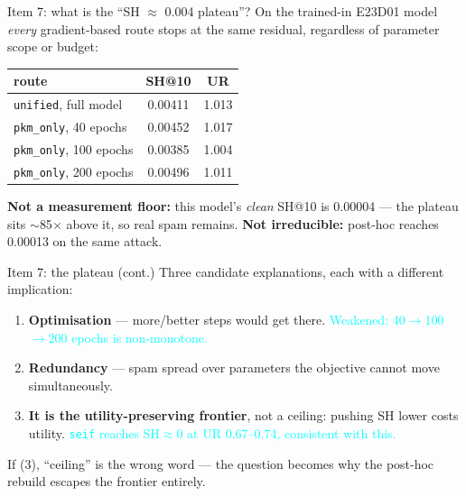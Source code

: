\documentclass{beamer}
\newcommand{\pierre}[1]{\textcolor{cyan}{#1}}
\begin{document}
\begin{frame}{Item 7: what is the ``SH $\approx$ 0.004 plateau''?}
On the trained-in E23D01 model \emph{every} gradient-based route stops at the
same residual, regardless of parameter scope or budget:
\begin{center}
\begin{tabular}{|l|c|c|}
\hline
route & SH@10 & UR \\
\hline
\texttt{unified}, full model   & 0.00411 & 1.013 \\
\texttt{pkm\_only}, 40 epochs  & 0.00452 & 1.017 \\
\texttt{pkm\_only}, 100 epochs & 0.00385 & 1.004 \\
\texttt{pkm\_only}, 200 epochs & 0.00496 & 1.011 \\
\hline
\end{tabular}
\end{center}

\textbf{Not a measurement floor:} this model's \emph{clean} SH@10 is 0.00004 ---
the plateau sits $\sim$85$\times$ above it, so real spam remains.
\textbf{Not irreducible:} post-hoc reaches 0.00013 on the same attack.

\end{frame}

\begin{frame}{Item 7: the plateau (cont.)}
Three candidate explanations, each with a different implication:
\begin{enumerate}
  \item \textbf{Optimisation} --- more/better steps would get there.
        \pierre{Weakened: 40$\to$100$\to$200 epochs is non-monotone.}
  \item \textbf{Redundancy} --- spam spread over parameters the objective cannot
        move simultaneously.
  \item \textbf{It is the utility-preserving frontier}, not a ceiling: pushing SH
        lower costs utility. \pierre{\texttt{seif} reaches SH$\approx$0 at
        UR 0.67--0.74, consistent with this.}
\end{enumerate}

\medskip
\alert{If (3), ``ceiling'' is the wrong word} --- the question becomes why the
post-hoc rebuild escapes the frontier entirely.
\end{frame}
\end{document}
